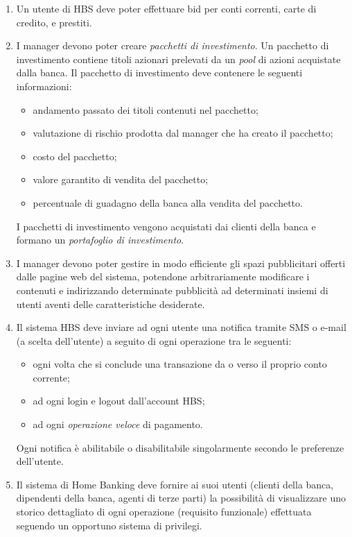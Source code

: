 \begin{enumerate}
	\item \label{itm:utente:funzionali:bidding:utente} Un utente di HBS deve poter effettuare bid per conti correnti, carte di credito, e prestiti.
	\item \label{itm:utente:funzionali:management:pacchetti-investimento:creazione} I manager devono poter creare \emph{pacchetti di investimento}.
		Un pacchetto di investimento contiene titoli azionari prelevati da un \emph{pool} di azioni acquistate dalla banca.
		Il pacchetto di investimento deve contenere le seguenti informazioni:
		\begin{itemize}
			\item andamento passato dei titoli contenuti nel pacchetto;
			\item valutazione di rischio prodotta dal manager che ha creato il pacchetto;
			\item costo del pacchetto;
			\item valore garantito di vendita del pacchetto;
			\item percentuale di guadagno della banca alla vendita del pacchetto.
		\end{itemize}
		I pacchetti di investimento vengono acquistati dai clienti della banca e formano un \emph{portafoglio di investimento}.
	\item \label{itm:utente:funzionali:management:pubblicita} I manager devono poter gestire in modo efficiente gli spazi pubblicitari offerti dalle pagine web del sistema, potendone arbitrariamente modificare i contenuti e indirizzando determinate pubblicità ad determinati insiemi di utenti aventi delle caratteristiche desiderate.
	\item \label{itm:utente:funzionali:notifiche} Il sistema HBS deve inviare ad ogni utente una notifica tramite SMS o e-mail (a scelta dell'utente) a seguito di ogni operazione tra le seguenti:
		\begin{itemize}
			\item ogni volta che si conclude una transazione da o verso il proprio conto corrente;
			\item ad ogni login e logout dall'account HBS;
			\item ad ogni \emph{operazione veloce} di pagamento.
		\end{itemize}
	Ogni notifica \`e abilitabile o disabilitabile singolarmente secondo le preferenze dell'utente.
	\item \label{itm:utente:funzionali:storico-dettagliato} Il sistema di Home Banking deve fornire ai suoi utenti (clienti della banca, dipendenti della banca, agenti di terze parti) la possibilit\`a di visualizzare uno storico dettagliato di ogni operazione (requisito funzionale) effettuata seguendo un opportuno sistema di privilegi.
\end{enumerate}

